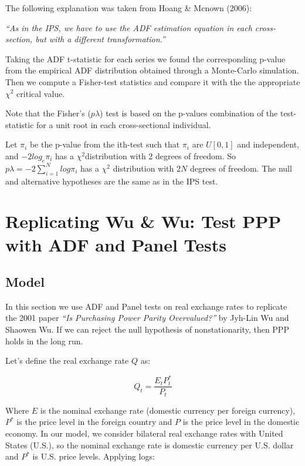 \documentclass[]{article}
\begin{document}
The following explanation was taken from Hoang \& Mcnown (2006):

\emph{``As in the IPS, we have to use the ADF estimation equation in each cross-section, but with a different transformation.''}

Taking the ADF t-statistic for each series we found the corresponding p-value from the empirical ADF distribution obtained through a Monte-Carlo simulation. Then we compute a Fisher-test statistics and compare it with the the appropriate \(\chi^2\) critical value.

Note that the Fisher's (\(p \lambda\)) test is based on the p-values combination of the test-statistic for a unit root in each cross-sectional individual.

Let \(\pi_{i}\) be the p-value from the ith-test such that \(\pi_{i}\) are \(U[0, 1]\) and independent, and \(-2log_{e}\pi_{i}\) has a \(\chi^2\)distribution with 2 degrees of freedom. So \(p \lambda = -2 \sum_{i=1}^{N} log \pi_i\) has a \(\chi^2\) distribution with \(2N\) degrees of freedom. The null and alternative hypotheses are the same as in the IPS test.

\hypertarget{replicating-wu-wu-test-ppp-with-adf-and-panel-tests}{%
\section{Replicating Wu \& Wu: Test PPP with ADF and Panel Tests}\label{replicating-wu-wu-test-ppp-with-adf-and-panel-tests}}

\hypertarget{model}{%
\subsection{Model}\label{model}}

In this section we use ADF and Panel tests on real exchange rates to replicate the 2001 paper \emph{``Is Purchasing Power Parity Overvalued?''} by Jyh-Lin Wu and Shaowen Wu. If we can reject the null hypothesis of nonstationarity, then PPP holds in the long run.

Let's define the real exchange rate \(Q\) as:

\[Q_{t} = \frac{E_{t}P^*_{t}}{P_{t}}\]

Where \(E\) is the nominal exchange rate (domestic currency per foreign currency), \(P^*\) is the price level in the foreign country and \(P\) is the price level in the domestic economy. In our model, we consider bilateral real exchange rates with United States (U.S.), so the nominal exchange rate is domestic currency per U.S. dollar and \(P^*\) is U.S. price levels.
Applying logs:
\end{document}
